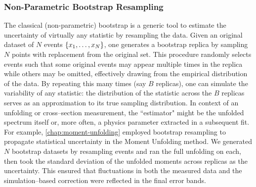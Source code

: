         \subsubsection{Non-Parametric Bootstrap Resampling}
            The classical (non-parametric) bootstrap is a generic tool to estimate the uncertainty of virtually any statistic by resampling the data.
            Given an original dataset of $N$ events $\qty{x_1,\dots,x_N}$, one generates a bootstrap replica by sampling $N$ points with replacement from the original set.
            This procedure randomly selects events such that some original events may appear multiple times in the replica while others may be omitted, effectively drawing from the empirical distribution of the data.
            By repeating this many times (say $B$ replicas), one can simulate the variability of any statistic: the distribution of the statistic across the $B$ replicas serves as an approximation to its true sampling distribution.
            In context of an unfolding or cross--section measurement, the ``estimator" might be the unfolded spectrum itself or, more often, a physics parameter extracted in a subsequent fit.
            For example, \cref{chap:moment-unfolding} employed bootstrap resampling to propagate statistical uncertainty in the Moment Unfolding method.
            We generated $N$ bootstrap datasets by resampling events and ran the full unfolding on each, then took the standard deviation of the unfolded moments across replicas as the uncertainty.
            This ensured that fluctuations in both the measured data and the simulation--based correction were reflected in the final error bands.

